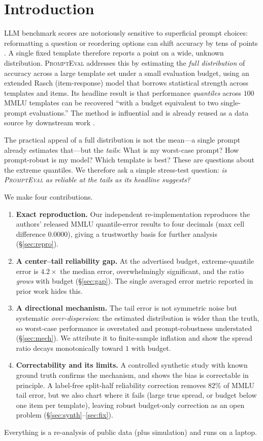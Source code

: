 \documentclass[11pt]{article}
\newcommand{\pe}{\textsc{PromptEval}}
\begin{document}
\section{Introduction}
LLM benchmark scores are notoriously sensitive to superficial prompt choices: reformatting a
question or reordering options can shift accuracy by tens of points
\citep{sclar2024quantifying,mizrahi2024state}. A single fixed template therefore reports a
point on a wide, unknown distribution. \pe{} \citep{polo2024prompteval} addresses this by
estimating the \emph{full distribution} of accuracy across a large template set under a small
evaluation budget, using an extended Rasch (item-response) model that borrows statistical
strength across templates and items. Its headline result is that performance \emph{quantiles}
across $100$ MMLU templates can be recovered ``with a budget equivalent to two single-prompt
evaluations.'' The method is influential and is already reused as a data source by downstream
work \citep{rankintervals2026}.

The practical appeal of a full distribution is not the mean---a single prompt already
estimates that---but the \emph{tails}: What is my worst-case prompt? How prompt-robust is my
model? Which template is best? These are questions about the extreme quantiles. We therefore
ask a simple stress-test question: \emph{is \pe{} as reliable at the tails as its headline
suggests?}

We make four contributions.
\begin{enumerate}\itemsep2pt
\item \textbf{Exact reproduction.} Our independent re-implementation reproduces the authors'
released MMLU quantile-error results to four decimals (max cell difference $0.0000$), giving a
trustworthy basis for further analysis (\S\ref{sec:repro}).
\item \textbf{A center--tail reliability gap.} At the advertised budget, extreme-quantile error
is $4.2\times$ the median error, overwhelmingly significant, and the ratio \emph{grows} with
budget (\S\ref{sec:gap}). The single averaged error metric reported in prior work hides this.
\item \textbf{A directional mechanism.} The tail error is not symmetric noise but systematic
\emph{over-dispersion}: the estimated distribution is wider than the truth, so worst-case
performance is overstated and prompt-robustness understated (\S\ref{sec:mech}). We attribute
it to finite-sample inflation and show the spread ratio decays monotonically toward $1$ with
budget.
\item \textbf{Correctability and its limits.} A controlled synthetic study with known ground
truth confirms the mechanism, and shows the bias is correctable in principle. A label-free
split-half reliability correction removes $82\%$ of MMLU tail error, but we also chart where it
fails (large true spread, or budget below one item per template), leaving robust budget-only
correction as an open problem (\S\ref{sec:synth}--\ref{sec:fix}).
\end{enumerate}
Everything is a re-analysis of public data (plus simulation) and runs on a laptop.
\end{document}

